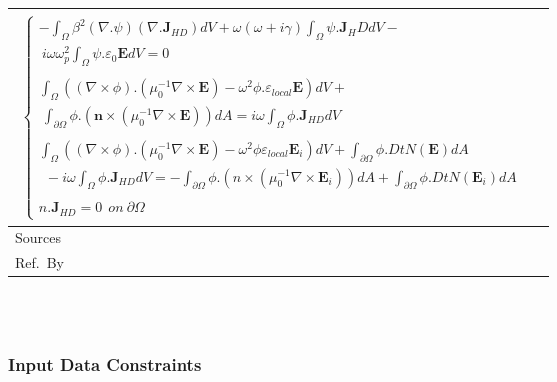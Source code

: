 \documentclass[12pt]{article}
\newcommand{\colBwidth}{0.82\textwidth} \newcommand{\colCwidth}{0.1\textwidth}
\begin{document}
\begin{minipage}{\textwidth}
\begin{tabular}{| p{\colAwidth} |
				p{\colBwidth}|}
\begin{equation}
\begin{gathered}
\begin{cases}
						-\int_\Omega
						\beta^2(\nabla.\psi)(\nabla.\textbf{J}_{HD})dV+\omega(\omega+i\gamma)\int_{\Omega} \psi. \textbf{J}_HD dV - \\ \ i\omega \omega^2_p \int_\Omega \psi.\varepsilon_{0}\textbf{E}dV = 0 \\
						
						 \\ \int_\Omega ((\nabla \times \phi) . (\mu^{-1}_0 \nabla \times \textbf{E})-\omega^2 \phi.\varepsilon_{local} \textbf{E}) dV + \\ \ \int_{\partial \Omega} \phi.(\textbf{n} \times (\mu^{-1}_0 \nabla \times \textbf{E}))dA = i\omega \int_\Omega \phi. \textbf{J}_{HD} dV
						
						\\ \\ \int_\Omega ((\nabla \times \phi).(\mu^{-1}_{0} \nabla \times
						\textbf{E})- \omega^2\phi \varepsilon_{local} \textbf{E}_i)dV + \int_{\partial
							\Omega} \phi . DtN(\textbf{E})dA\\ \ \ - i\omega \int_\Omega \phi .
						\textbf{J}_{HD}dV =  -\int_{\partial \Omega} \phi.(n \times (\mu^{-1}_0
						\nabla \times \textbf{E}_i))dA + \int_{\partial \Omega}
						\phi.DtN(\textbf{E}_i)dA
						\\
						\\ n.\textbf{J}_{HD}=0 \ \ on \ \partial \Omega \end{cases} \end{gathered} 
			\end{equation} \\
			\hline Sources& \cite{hiremath2012numerical}\\ 
			\hline 
			Ref.\ By & 
			\\ \hline
	\end{tabular} \end{minipage}\\
	
	
	
	~\newline
	

	
	
	\subsubsection{Input Data Constraints} \label{sec_DataConstraints}
	
\end{document}
